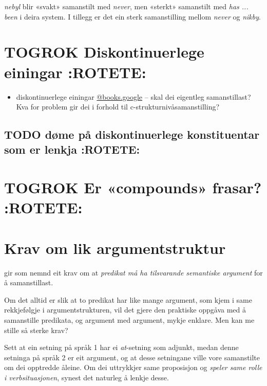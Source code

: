 \documentclass[11pt,a4paper,oneside,draft]{book}
\begin{document}
\emph{nebyl} blir «svakt» samanstilt med \emph{never}, men «sterkt» samanstilt med
\emph{has ... been} i deira system. I tillegg er det ein sterk samanstilling
mellom \emph{never} og \emph{nikby}.


\section{\textbf{TOGROK} Diskontinuerlege einingar \textbf{:ROTETE:}}
\label{sec-3.10}

\begin{itemize}
\item diskontinuerlege einingar \cite[s.~4]{cheung2002scg}
     \href{http://scholar.google.no/scholar.bib%3Fhl%3Dno&lr%3D&ie%3DUTF-8&q%3Dinfo:Qh_MRSftNZgJ:scholar.google.com/&output%3Dcitation&oe%3DMACINTOSH&oi%3Dcitation}{@books.google} -- skal dei eigentleg samanstillast? Kva for problem
     gir dei i forhold til c-strukturnivåsamanstilling?
\end{itemize}
\subsection{\textbf{TODO} døme på diskontinuerlege konstituentar som er lenkja \textbf{:ROTETE:}}
\label{sec-3.10.1}

\section{\textbf{TOGROK} Er «compounds» frasar? \textbf{:ROTETE:}}
\label{sec-3.11}

 \citep[p.~1]{giegerich2006aea}


\section{Krav om lik argumentstruktur}
\label{sec-3.12}

\label{SEC:lik-argstr}

\citet{thunes2003eal} gir som nemnd eit krav om at \emph{predikat må ha tilsvarande semantiske argument} for å samanstillast.

Om det alltid er slik at to predikat har like mange argument, som kjem i
same rekkjefølgje i argumentstrukturen, vil det gjere den praktiske
oppgåva med å samanstille predikata, og argument med argument, mykje
enklare. Men kan me stille så sterke krav?

Sett at ein setning på språk 1 har ei \emph{at}-setning som adjunkt, medan
denne setninga på språk 2 er eit argument, og at desse setningane
ville vore samanstilte om dei opptredde åleine. Om dei uttrykkjer same
proposisjon og \emph{speler same rolle i verbsituasjonen},
synest det naturleg å lenkje desse.  
\end{document}
